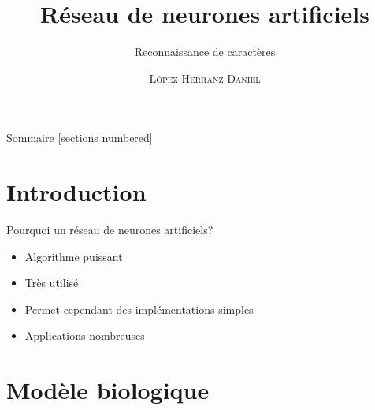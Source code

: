 \documentclass[10pt]{beamer}
\title{R\'eseau de neurones artificiels}
\subtitle{Reconnaissance de caract\`eres}
\date{}
\author{\textsc{L\'opez Herranz Daniel}}
\institute{Lyc\'ee Saint-Louis}
\begin{document}
\maketitle

\begin{frame}{Sommaire}
  [sections numbered]
  \tableofcontents[hideallsubsections]
\end{frame}

\section{Introduction}

\begin{frame}[fragile]{Pourquoi un r\'eseau de neurones artificiels?}
	\begin{itemize}
		\item Algorithme puissant
		\item Tr\`es utilis\'e
		\item Permet cependant des impl\'ementations simples
		\item Applications nombreuses
	\end{itemize}
\end{frame}

\section{Mod\`ele biologique}
\end{document}
